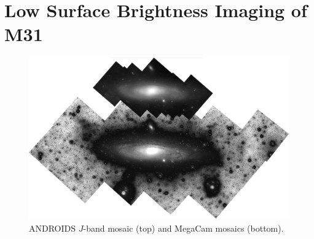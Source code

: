 \documentclass[11pt,twoside]{article}
\begin{document}
\section{Low Surface Brightness Imaging of M31}

\begin{figure}[t]
\centering
\includegraphics[width=\columnwidth]{mosaics}
\caption{ANDROIDS $J$-band mosaic (top) and MegaCam mosaics (bottom).}
\label{fig:mosaics}
\end{figure}
\end{document}
